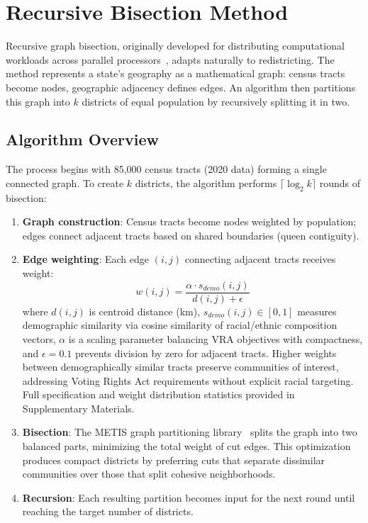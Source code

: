 \section{Recursive Bisection Method}

Recursive graph bisection, originally developed for distributing computational workloads across parallel processors~\cite{karypis1998metis}, adapts naturally to redistricting. The method represents a state's geography as a mathematical graph: census tracts become nodes, geographic adjacency defines edges. An algorithm then partitions this graph into $k$ districts of equal population by recursively splitting it in two.

\subsection{Algorithm Overview}

The process begins with 85,000 census tracts (2020 data) forming a single connected graph. To create $k$ districts, the algorithm performs $\lceil \log_2 k \rceil$ rounds of bisection:

\begin{enumerate}
\item \textbf{Graph construction}: Census tracts become nodes weighted by population; edges connect adjacent tracts based on shared boundaries (queen contiguity).
\item \textbf{Edge weighting}: Each edge $(i,j)$ connecting adjacent tracts receives weight:
\[
w(i,j) = \frac{\alpha \cdot s_{demo}(i,j)}{d(i,j) + \epsilon}
\]
where $d(i,j)$ is centroid distance (km), $s_{demo}(i,j) \in [0,1]$ measures demographic similarity via cosine similarity of racial/ethnic composition vectors, $\alpha$ is a scaling parameter balancing VRA objectives with compactness, and $\epsilon = 0.1$ prevents division by zero for adjacent tracts. Higher weights between demographically similar tracts preserve communities of interest, addressing Voting Rights Act requirements without explicit racial targeting. Full specification and weight distribution statistics provided in Supplementary Materials.
\item \textbf{Bisection}: The METIS graph partitioning library~\cite{karypis1998metis} splits the graph into two balanced parts, minimizing the total weight of cut edges. This optimization produces compact districts by preferring cuts that separate dissimilar communities over those that split cohesive neighborhoods.
\item \textbf{Recursion}: Each resulting partition becomes input for the next round until reaching the target number of districts.
\end{enumerate}

